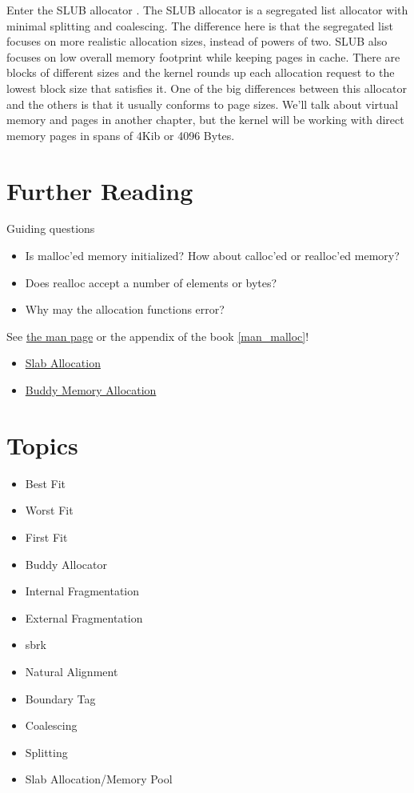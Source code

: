 Enter the SLUB allocator .
The SLUB allocator is a segregated list allocator with minimal splitting and coalescing.
The difference here is that the segregated list focuses on more realistic allocation sizes, instead of powers of two.
SLUB also focuses on low overall memory footprint while keeping pages in cache.
There are blocks of different sizes and the kernel rounds up each allocation request to the lowest block size that satisfies it.
One of the big differences between this allocator and the others is that it usually conforms to page sizes.
We'll talk about virtual memory and pages in another chapter, but the kernel will be working with direct memory pages in spans of 4Kib or 4096 Bytes.

\section{Further Reading}

Guiding questions

\begin{itemize}
\item Is malloc'ed memory initialized? How about calloc'ed or realloc'ed memory?
\item Does realloc accept a number of elements or bytes?
\item Why may the allocation functions error?
\end{itemize}

See \href{http://man7.org/linux/man-pages/man3/malloc.3.html}{the man page} or the appendix of the book \ref{man_malloc}!

\begin{itemize}
\item \href{https://en.wikipedia.org/wiki/Slab_allocation}{Slab Allocation}
\item
  \href{http://en.wikipedia.org/wiki/Buddy_memory_allocation}{Buddy Memory Allocation}
\end{itemize}

\section{Topics}

\begin{itemize}
\item
  Best Fit
\item
  Worst Fit
\item
  First Fit
\item
  Buddy Allocator
\item
  Internal Fragmentation
\item
  External Fragmentation
\item
  sbrk
\item
  Natural Alignment
\item
  Boundary Tag
\item
  Coalescing
\item
  Splitting
\item
  Slab Allocation/Memory Pool
\end{itemize}

